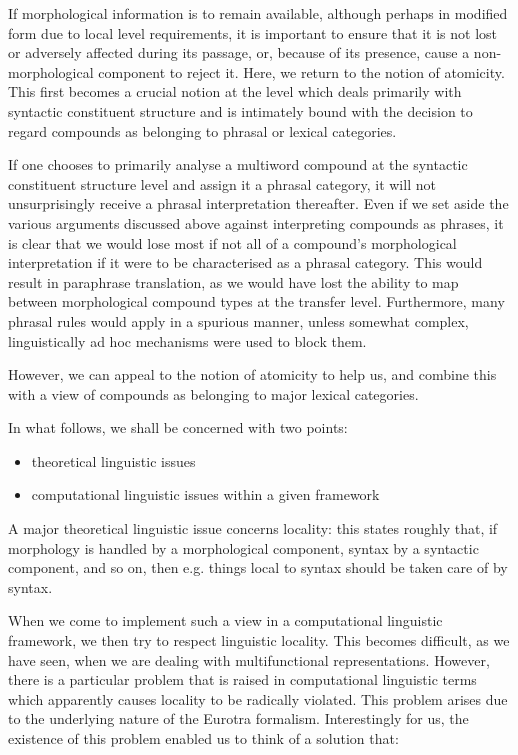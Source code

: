 If  morphological information is to  remain  available,  although 
perhaps  in modified form due to local level requirements,  it is 
important  to  ensure that it is not lost or  adversely  affected 
during  its passage,  or,  because of its presence,  cause a non-
morphological  component to reject it.  Here,  we return  to  the  
notion  of atomicity.  This first becomes a crucial notion at the 
level which deals primarily with syntactic constituent  structure 
and  is intimately bound with the decision to regard compounds as 
belonging to phrasal or lexical categories. 

If one chooses to primarily analyse  a multiword compound at  the 
syntactic  constituent  structure level and assign it  a  phrasal 
category,   it  will  not   unsurprisingly  receive   a   phrasal  
interpretation   thereafter.  Even  if we set aside  the  various 
arguments  discussed  above  against  interpreting  compounds  as 
phrases,  it  is  clear that we would lose most if not all  of  a 
compound's   morphological  interpretation  if  it  were  to   be 
characterised  as  a  phrasal  category.  This  would  result  in 
paraphrase translation,  as we would have lost the ability to map 
between  morphological  compound  types at  the  transfer  level. 
Furthermore, many phrasal rules would apply in a spurious manner, 
unless  somewhat complex,  linguistically ad hoc mechanisms  were 
used to block them.

However, we can appeal to the notion of atomicity to help us, and 
combine  this  with  a view of compounds as  belonging  to  major 
lexical categories. 

In what follows, we shall be concerned with two points:

\begin{itemize}
\item  theoretical linguistic issues 
\item  computational linguistic issues within a given framework

\end{itemize}
A  major  theoretical linguistic issue  concerns  locality:  this 
states roughly that,  if morphology is handled by a morphological 
component,  syntax by a syntactic component, and so on, then e.g. 
things local to syntax should be taken care of by syntax.

When  we  come  to  implement  such a  view  in  a  computational 
linguistic framework, we then try to respect linguistic locality. 
This becomes difficult, as we have seen, when we are dealing with 
multifunctional representations.  However,  there is a particular 
problem  that is raised in computational linguistic  terms  which 
apparently causes locality to be radically violated. This problem 
arises  due  to the underlying nature of the  Eurotra  formalism. 
Interestingly for us, the existence of this problem enabled us to 
think of a solution that:

